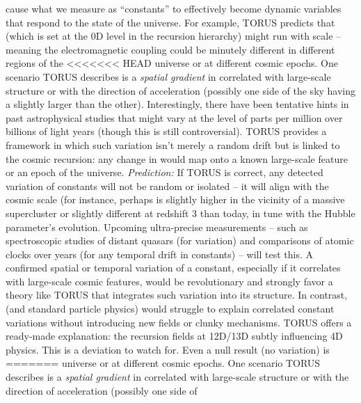 \documentclass[]{article}
\begin{document}
\begin{itemize}
  cause what we measure as ``constants'' to effectively become dynamic
  variables that respond to the state of the universe. For example,
  TORUS predicts that \alpha (which is set at the 0D level in the recursion
  hierarchy) might run with scale -- meaning the electromagnetic
  coupling could be minutely different in different regions of the
<<<<<<< HEAD
  universe or at different cosmic epochs\hspace{0pt}. One scenario TORUS
  describes is a \emph{spatial gradient} in \alpha correlated with
  large-scale structure or with the direction of acceleration (possibly
  one side of the sky having a slightly larger \alpha than the
  other)\hspace{0pt}. Interestingly, there have been tentative hints in
  past astrophysical studies that \alpha might vary at the level of parts per
  million over billions of light years (though this is still
  controversial). TORUS provides a framework in which such variation
  isn't merely a random drift but is linked to the cosmic recursion: any
  change in \alpha would map onto a known large-scale feature or an epoch of
  the universe. \emph{Prediction:} If TORUS is correct, any detected
  variation of constants will not be random or isolated -- it will align
  with the cosmic scale (for instance, perhaps \alpha is slightly higher in
  the vicinity of a massive supercluster or slightly different at
  redshift 3 than today, in tune with the Hubble parameter's evolution.
  Upcoming ultra-precise measurements -- such as spectroscopic studies
  of distant quasars (for \alpha variation) and comparisons of atomic clocks
  over years (for any temporal drift in constants) -- will test
  this\hspace{0pt}. A confirmed spatial or temporal variation of a
  constant, especially if it correlates with large-scale cosmic
  features, would be revolutionary and strongly favor a theory like
  TORUS that integrates such variation into its structure. In contrast,
   (and standard particle physics) would struggle to explain
  correlated constant variations without introducing new fields or
  clunky mechanisms. TORUS offers a ready-made explanation: the
  recursion fields at 12D/13D subtly influencing 4D physics\hspace{0pt}.
  This is a deviation to watch for. Even a null result (no variation) is
=======
  universe or at different cosmic epochs​. One scenario TORUS describes
  is a \emph{spatial gradient} in \alpha correlated with large-scale
  structure or with the direction of acceleration (possibly one side of

\end{itemize}
\end{document}
